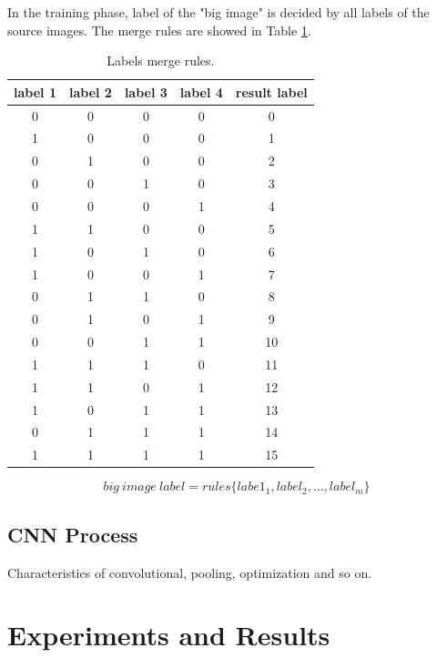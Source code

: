 \documentclass[sensors,article,submit,moreauthors,pdftex,10pt,a4paper]{mdpi}
\begin{document}
In the training phase, label of the "big image" is decided by all labels of the source images. The merge rules are showed in Table \ref{LabelsMergeRules}.

\begin{table}[H]
\caption{Labels merge rules.}
\centering
\begin{tabular}{cccc|c}
\toprule
\textbf{label 1}	& \textbf{label 2}	& \textbf{label 3}	& \textbf{label 4}	& \textbf{result label}\\
\midrule
0		& 0			& 0				&0					&0\\
1		& 0			& 0				&0					&1\\
0		& 1			& 0				&0					&2\\
0		& 0			& 1				&0					&3\\
0		& 0			& 0				&1					&4\\
1		& 1			& 0				&0					&5\\
1		& 0			& 1				&0					&6\\
1		& 0			& 0				&1					&7\\
0		& 1			& 1				&0					&8\\
0		& 1			& 0				&1					&9\\
0		& 0			& 1				&1					&10\\
1		& 1			& 1				&0					&11\\
1		& 1			& 0				&1					&12\\
1		& 0			& 1				&1					&13\\
0		& 1			& 1				&1					&14\\
1		& 1			& 1				&1					&15\\
\bottomrule
\end{tabular}
\label{LabelsMergeRules}
\end{table}

\begin{equation}
big\ image\ label = rules\{labe1_1, label_2, ..., label_m\}
\end{equation}

\subsection{CNN Process}

Characteristics of convolutional, pooling, optimization and so on.  

\section{Experiments and Results}
\end{document}
